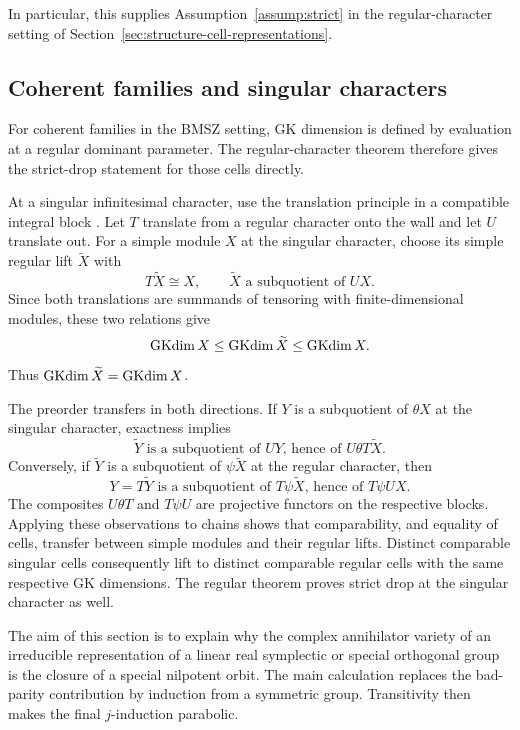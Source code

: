 In particular, this supplies Assumption~\ref{assump:strict} in the
regular-character setting of
Section~\ref{sec:structure-cell-representations}.

\subsection{Coherent families and singular characters}

For coherent families in the BMSZ setting, GK dimension is defined by
evaluation at a regular dominant parameter. The regular-character theorem
therefore gives the strict-drop statement for those cells directly.

At a singular infinitesimal character, use the translation principle in a
compatible integral block \cite[\S7.3]{Vogan1981}. Let $T$ translate from
a regular character onto the wall and let $U$ translate out. For a simple
module $X$ at the singular character, choose its simple regular lift
$\widetilde X$ with
\[
  T\widetilde X\cong X,
  \qquad
  \widetilde X\text{ a subquotient of }UX.
\]
Since both translations are summands of tensoring with finite-dimensional
modules, these two relations give
\[
  \operatorname{GKdim} X\leq\operatorname{GKdim}\widetilde X\leq\operatorname{GKdim} X.
\]
Thus $\operatorname{GKdim}\widetilde X=\operatorname{GKdim} X$.

The preorder transfers in both directions. If $Y$ is a subquotient of
$\theta X$ at the singular character, exactness implies
\[
  \widetilde Y
  \text{ is a subquotient of }
  UY
  \text{, hence of }U\theta T\widetilde X.
\]
Conversely, if $\widetilde Y$ is a subquotient of $\psi\widetilde X$ at
the regular character, then
\[
  Y=T\widetilde Y
  \text{ is a subquotient of }T\psi\widetilde X
  \text{, hence of }T\psi UX.
\]
The composites $U\theta T$ and $T\psi U$ are projective functors on the
respective blocks. Applying these observations to chains shows that
comparability, and equality of cells, transfer between simple modules and
their regular lifts. Distinct comparable singular cells consequently lift
to distinct comparable regular cells with the same respective GK
dimensions. The regular theorem proves strict drop at the singular
character as well.


\label{sec:special-annihilator-classical}

The aim of this section is to explain why the complex annihilator variety
of an irreducible representation of a linear real symplectic or special
orthogonal group is the closure of a special nilpotent orbit. The main
calculation replaces the bad-parity contribution by induction from a
symmetric group. Transitivity then makes the final $j$-induction parabolic.


